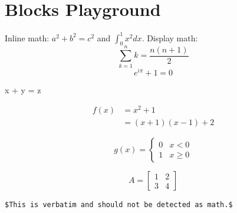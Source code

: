 \section{Blocks Playground}\label{sec:blocks}
Inline math: $a^2 + b^2 = c^2$ and \( \int_0^1 x^2 dx \).
Display math:
\[
  \sum_{k=1}^n k = \frac{n(n+1)}{2}
\]
$$
  e^{i\pi} + 1 = 0
$$

\begin{eqbox}
  \label{eq:eqbox}
  x + y = z
\end{eqbox}

\begin{align}
  f(x) &= x^2 + 1 \\
       &= (x+1)(x-1) + 2
\end{align}

\begin{equation}
  g(x) = \begin{cases}
    0 & x < 0 \\
    1 & x \ge 0
  \end{cases}
\end{equation}

\begin{equation}
  A = \begin{bmatrix}
    1 & 2 \\
    3 & 4
  \end{bmatrix}
\end{equation}

\begin{verbatim}
$This is verbatim and should not be detected as math.$
\end{verbatim}
